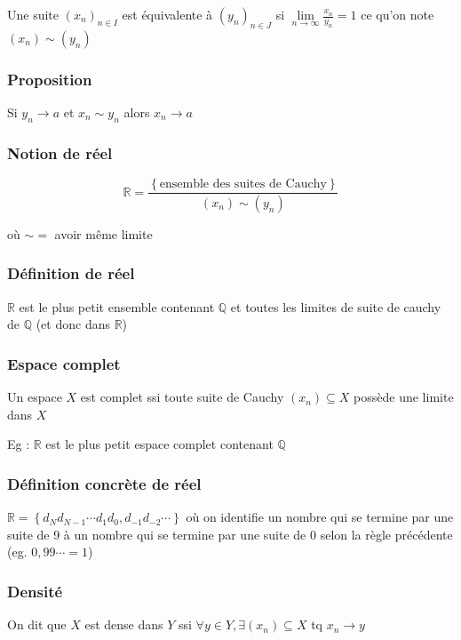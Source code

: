 \documentclass[a4paper,10pt]{article}
\newcommand{\ap}{\rightarrow}
\newcommand{\R}{\mathbb{R}}
\newcommand{\Q}{\mathbb{Q}}
\newcommand{\tset}[1]{\left\lbrace #1 \right\rbrace}
\begin{document}
Une suite $(x_n)_{n\in I}$ est équivalente à $(y_n)_{n\in J}$ si $\lim\limits_{n\ap \infty} \frac{x_n}{y_n} = 1$ ce qu'on note $(x_n) \sim (y_n)$

\subsubsection{Proposition}

Si $y_n \ap a$ et $x_n \sim y_n$ alors $x_n \ap a$
\subsubsection{Notion de réel}

$$\R = \frac{\tset{\mbox{ensemble des suites de Cauchy}}}{(x_n) \sim (y_n)}$$

où $\sim =$ avoir même limite

\subsubsection{Définition de réel}

$\R$ est le plus petit ensemble contenant $\Q$ et toutes les limites de suite de cauchy de $\Q$ (et donc dans $\R$)

\subsubsection{Espace complet} 

Un espace $X$ est complet ssi toute suite de Cauchy $(x_n) \subseteq X$ possède une limite dans $X$

Eg : $\R$ est le plus petit espace complet contenant $\Q$

\subsubsection{Définition concrète de réel}

$\R = \tset{ d_N d_{N-1} \cdots d_1 d_0, d_{-1} d_{-2} \cdots}$ où on identifie un nombre qui se termine par une suite de 9 à un nombre qui se termine par une suite de 0 selon la règle précédente (eg. $0,99\cdots = 1$)

\subsubsection{Densité}

On dit que $X$ est dense dans $Y$ ssi $\forall y \in Y, \exists (x_n) \subseteq X$ tq $x_n \ap y$
\end{document}

